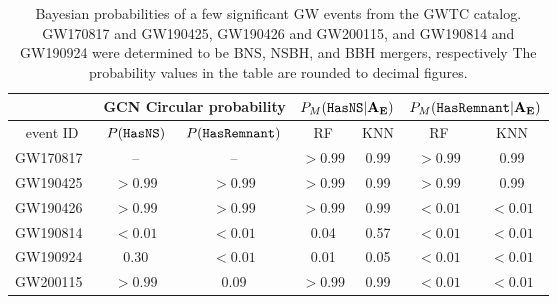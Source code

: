 \begin{table}[]
\begin{tabular}{c|cc|cc|cc}
\hline
\multicolumn{1}{c|}{}  &  \multicolumn{2}{c|}{GCN Circular probability}                                                & \multicolumn{2}{c|}{$P_M({{\tt HasNS}}|{\bf A}_{\bf E})$}                                                & \multicolumn{2}{c}{$P_M({{\tt HasRemnant}}|{\bf A}_{\bf E})$}                                                \\ \hline
\multicolumn{1}{c|}{event ID}  & \multicolumn{1}{c}{$P({{\tt HasNS}})$} & \multicolumn{1}{c}{$P({{\tt HasRemnant}})$}  & \multicolumn{1}{c}{RF} & \multicolumn{1}{c}{KNN}  & \multicolumn{1}{c}{RF} & \multicolumn{1}{c}{KNN} \\ \hline
GW170817~\cite{2017GCN.21509....1L}      &  -- &          --                  & $>0.99$                 & 0.99                    & $>0.99$                   & 0.99                                \\
GW190425~\cite{2019GCN.24168....1L}     & $>0.99$      & $>0.99$                        & $>0.99$                  & 0.99                    & $>0.99$                   & 0.99                          \\
GW190426~\cite{2019GCN.24237....1L}                               &     $>0.99$      & $>0.99$ & $>0.99$                   & 0.99                    & $< 0.01$             & $< 0.01$                    \\
GW190814~\cite{2019GCN.25324....1L}                                  &   $< 0.01$ & $<0.01$ & 0.04                   & 0.57                   & $< 0.01$              & $< 0.01$                      \\
GW190924~\cite{2019GCN.25829....1L}                                                          &   $0.30$ & $<0.01$ & 0.01                  & 0.05                   & $< 0.01$              & $< 0.01$                       \\               
GW200115~\cite{2020GCN.26759....1L}                                                         &     $>0.99$      & $0.09$ & $>0.99$                   & 0.99                   & $< 0.01$              & $< 0.01$                           \\
\hline
\end{tabular}
\caption{Bayesian probabilities of a few significant \ac{GW} events from the \ac{GWTC} catalog. GW170817 and GW190425, GW190426 and GW200115, and GW190814 and GW190924 were determined to be \ac{BNS}, \ac{NSBH}, and \ac{BBH} mergers, respectively The probability values in the table are rounded to  decimal figures.}
\label{tab:real_data_bayesian}
\end{table}

